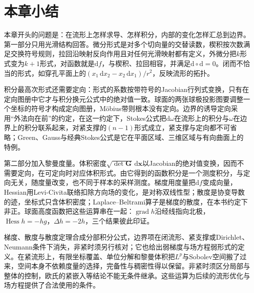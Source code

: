 \section{本章小结}
\label{sec:mcalc-summary}

本章开头的问题是：在流形上怎样求导、怎样积分，内部的变化怎样汇总到边界。第一部分只用光滑结构回答。微分形式是对多个切向量的交替读数，楔积按次数满足交换符号规则，拉回沿映射反向作用且对任何光滑映射都有定义，外微分把$k$形式变为$k+1$形式，对函数就是$\mathrm df$，与楔积、拉回相容，并满足$\mathrm d\circ\mathrm d=0$。闭而不恰当的形式，如穿孔平面上的$(x_1\,\mathrm dx_2-x_2\,\mathrm dx_1)/r^2$，反映流形的拓扑。

积分最高次形式还需要定向：形式的系数按带符号的Jacobian行列式变换，只有在定向图册中它才与积分换元公式中的绝对值一致。球面的两张球极投影图要调整一个坐标的符号才构成定向图册，M\"obius带则根本没有定向。边界的诱导定向采用“外法向在前”的约定，在这一约定下，Stokes公式把$\mathrm d\omega$在流形上的积分与$\omega$在边界上的积分联系起来，对紧支撑的$(n-1)$形式成立，紧支撑与定向都不可省略；Green、Gauss与经典Stokes公式是它在平面区域、三维区域与有向曲面上的特例。

第二部分加入黎曼度量。体积密度$\sqrt{\det\bm G}\,\mathrm d\bm x$以Jacobian的绝对值变换，因而不需要定向，在可定向时对应体积形式。由它得到的函数积分是一个测度积分，与定向无关，随度量改变，也不同于样本的采样测度。梯度用度量把$\mathrm df$变成向量，Hessian用Levi-Civita联络扣除方向场的变化，是对称双线性型；散度是协变导数的迹，坐标式只含体积密度；Laplace--Beltrami算子是梯度的散度，在本书约定下非正。球面高度函数把这些运算串在一起：$\operatorname{grad}h$沿经线指向北极，$\operatorname{Hess}h=-hg$，$\Delta h=-2h$，三个结果彼此印证。

梯度、散度与散度定理合成分部积分公式，边界项在闭流形、紧支撑或Dirichlet、Neumann条件下消失，非紧时须另行核对；它也给出弱梯度与场方程弱形式的定义。在紧流形上，有限坐标覆盖、单位分解和黎曼体积把$L^p$与Sobolev空间搬了过来，空间本身不依赖度量的选择，完备性与稠密性得以保留。非紧时须区分局部与整体的控制，欧氏的紧嵌入等结论不能无条件继承。这些运算为后续的流形优化与场方程提供了合法使用的条件。
